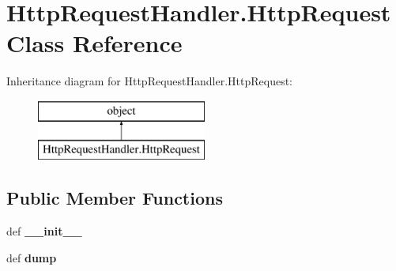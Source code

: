 \hypertarget{class_http_request_handler_1_1_http_request}{\section{Http\-Request\-Handler.\-Http\-Request Class Reference}
\label{class_http_request_handler_1_1_http_request}
}
Inheritance diagram for Http\-Request\-Handler.\-Http\-Request\-:\begin{figure}[H]
\begin{center}
\leavevmode
\includegraphics[height=2.000000cm]{class_http_request_handler_1_1_http_request}
\end{center}
\end{figure}
\subsection*{Public Member Functions}
\begin{DoxyCompactItemize}
\item 
\hypertarget{class_http_request_handler_1_1_http_request_a30bc663deb6096f298b2fef1a7ce9194}{def {\bfseries \-\_\-\-\_\-init\-\_\-\-\_\-}}\label{class_http_request_handler_1_1_http_request_a30bc663deb6096f298b2fef1a7ce9194}

\item 
\hypertarget{class_http_request_handler_1_1_http_request_ab9d518b2d0bd87a15f35e8a40fe2bdcc}{def {\bfseries dump}}\label{class_http_request_handler_1_1_http_request_ab9d518b2d0bd87a15f35e8a40fe2bdcc}

\end{DoxyCompactItemize}
